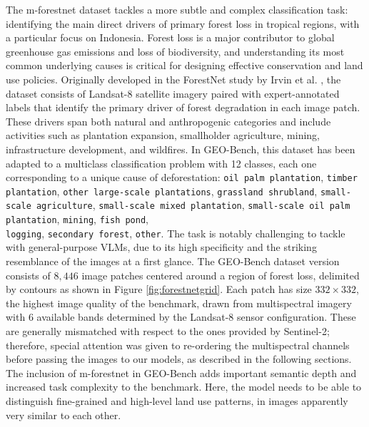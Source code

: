 \documentclass[a4paper, twoside, english]{sapthesis} %
\begin{document}
The m-forestnet dataset tackles a more subtle and complex classification task: identifying the main direct drivers of primary forest loss in tropical regions, with a particular focus on Indonesia. Forest loss is a major contributor to global greenhouse gas emissions and loss of biodiversity, and understanding its most common underlying causes is critical for designing effective conservation and land use policies.
Originally developed in the ForestNet study by Irvin et al. \cite{irvin2020forestnet}, the dataset consists of Landsat-8 satellite imagery paired with expert-annotated labels that identify the primary driver of forest degradation in each image patch. These drivers span both natural and anthropogenic categories and include activities such as plantation expansion, smallholder agriculture, mining, infrastructure development, and wildfires.
In GEO-Bench, this dataset has been adapted to a multiclass classification problem with 12 classes, each one corresponding to a unique cause of deforestation: \texttt{oil palm plantation}, \texttt{timber plantation}, \texttt{other large-scale plantations}, \texttt{grassland shrubland}, \texttt{small-scale agriculture}, \texttt{small-scale mixed plantation}, \texttt{small-scale oil palm plantation}, \texttt{mining}, \texttt{fish pond}, \\ \texttt{logging}, \texttt{secondary forest}, \texttt{other}. The task is notably challenging to tackle with general-purpose VLMs, due to its high specificity and the striking resemblance of the images at a first glance. The GEO-Bench dataset version consists of $8,446$ image patches centered around a region of forest loss, delimited by contours as shown in Figure \ref{fig:forestnetgrid}. Each patch has size $332 \times 332$, the highest image quality of the benchmark, drawn from multispectral imagery with $6$ available bands determined by the Landsat-8 sensor configuration. These are generally mismatched with respect to the ones provided by Sentinel-2; therefore, special attention was given to re-ordering the multispectral channels before passing the images to our models, as described in the following sections.
The inclusion of m-forestnet in GEO-Bench adds important semantic depth and increased task complexity to the benchmark. Here, the model needs to be able to distinguish fine-grained and high-level land use patterns, in images apparently very similar to each other.

\vspace{0.3cm}
\end{document}
